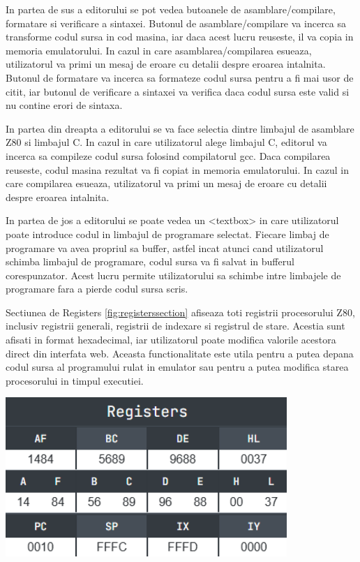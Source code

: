 \documentclass[titlepage,12pt]{article}
\DeclareRobustCommand{\code}[1]{{\ttfamily\small #1}}
\begin{document}
In partea de sus a editorului se pot vedea butoanele de asamblare/compilare, formatare si verificare a sintaxei. Butonul de asamblare/compilare va incerca sa transforme codul sursa in cod masina, iar daca acest lucru reuseste, il va copia in memoria emulatorului. In cazul in care asamblarea/compilarea esueaza, utilizatorul va primi un mesaj de eroare cu detalii despre eroarea intalnita. Butonul de formatare va incerca sa formateze codul sursa pentru a fi mai usor de citit, iar butonul de verificare a sintaxei va verifica daca codul sursa este valid si nu contine erori de sintaxa.

In partea din dreapta a editorului se va face selectia dintre limbajul de asamblare Z80 si limbajul C. In cazul in care utilizatorul alege limbajul C, editorul va incerca sa compileze codul sursa folosind compilatorul \code{gcc}. Daca compilarea reuseste, codul masina rezultat va fi copiat in memoria emulatorului. In cazul in care compilarea esueaza, utilizatorul va primi un mesaj de eroare cu detalii despre eroarea intalnita.

In partea de jos a editorului se poate vedea un \code{<textbox>} in care utilizatorul poate introduce codul in limbajul de programare selectat. Fiecare limbaj de programare va avea propriul sa buffer, astfel incat atunci cand utilizatorul schimba limbajul de programare, codul sursa va fi salvat in bufferul corespunzator. Acest lucru permite utilizatorului sa schimbe intre limbajele de programare fara a pierde codul sursa scris.

\begin{minipage}[c]{0.55\textwidth} %
    Sectiunea de \code{Registers} \cref{fig:registerssection} afiseaza toti registrii procesorului Z80, inclusiv registrii generali, registrii de indexare si registrul de stare. Acestia sunt afisati in format hexadecimal, iar utilizatorul poate modifica valorile acestora direct din interfata web. Aceasta functionalitate este utila pentru a putea depana codul sursa al programului rulat in emulator sau pentru a putea modifica starea procesorului in timpul executiei.
\end{minipage}%
\hfill
\begin{minipage}[c]{0.4\textwidth} %
    \centering
    \includegraphics[width=0.8\textwidth]{images/registerssection.png}
    \label{fig:registerssection}
\end{minipage}
\end{document}
